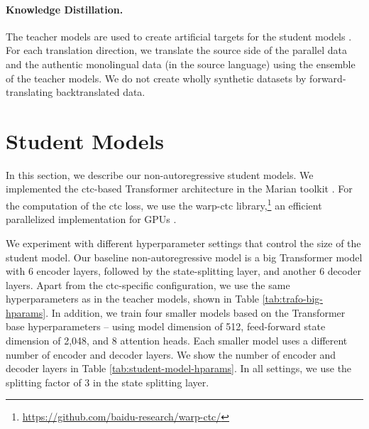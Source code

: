 \paragraph{Knowledge Distillation.} The teacher models are used to create
artificial targets for the student models \citep{kim-rush-2016-sequence}. For
each translation direction, we translate the source side of the parallel data
and the authentic monolingual data (in the source language) using the ensemble
of the teacher models. We do not create wholly synthetic datasets by
forward-translating backtranslated data.



\section{Student Models}%
\label{sec:exp:students}

In this section, we describe our non-autoregressive student models. We
implemented the \acs{ctc}-based Transformer architecture in the Marian toolkit
\citep{junczys-dowmunt-etal-2018-marian}. For the computation of the \ac{ctc}
loss, we use the warp-ctc
library,\footnote{\url{https://github.com/baidu-research/warp-ctc/}} an
efficient parallelized implementation for GPUs \citep{amodei-etal-2016-deep}.

We experiment with different hyperparameter settings that control the size of
the student model. Our baseline non-autoregressive model is a big Transformer
model with 6 encoder layers, followed by the state-splitting layer, and another
6 decoder layers. Apart from the \ac{ctc}-specific configuration, we use the
same hyperparameters as in the teacher models, shown in Table
\ref{tab:trafo-big-hparams}. In addition, we train four smaller models based on
the Transformer base hyperparameters -- using model dimension of 512,
feed-forward state dimension of 2,048, and 8 attention heads. Each smaller
model uses a different number of encoder and decoder layers. We show the number
of encoder and decoder layers in Table \ref{tab:student-model-hparams}. In all
settings, we use the splitting factor of 3 in the state splitting layer.

